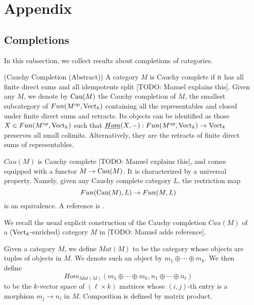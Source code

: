 \appendix
\section{Appendix}
   
\subsection{Completions}

\noindent In this subsection, we collect results about completions of categories.

\begin{definition} \label{definition/cauchy-completion/abstract} (Cauchy Completion (Abstract))
  A category $M$ is Cauchy complete if it has all finite direct sums and all
  idempotents split [TODO: Manuel explains this]. Given any $M$, we denote by $\operatorname{Cau}(M)$ the Cauchy
  completion of $M$, the smallest subcategory of $Fun(M^{op},\operatorname{Vect}_k)$
  containing all the representables and closed under finite direct sums and
  retracts. Its objects can be identified as those $X\in Fun(M^{op},\operatorname{Vect}_k)$
  such that $\underline{Hom}(X,-):Fun(M^{op},\operatorname{Vect}_k)\to\operatorname{Vect}_k$ preserves all
  small colimits. Alternatively, they are the retracts of finite direct sums
  of representables.

  $Cau(M)$ is Cauchy complete [TODO: Manuel explains this], and comes equipped with a functor
  $M\to \operatorname{Cau}(M)$. It is characterized by a universal property. Namely, given
  any Cauchy complete category $L$, the restriction
  map $$Fun(\operatorname{Cau}(M),L)\to Fun(M,L)$$ is an equivalence. A reference is
  \cite[Sections 5.5 and 5.7]{kelly/basic-concepts-enriched}.
\end{definition}

\noindent We recall the usual explicit construction of the Cauchy completion $Cau(M)$ of a ($\operatorname{Vect}_k$-enriched) category $M$ in [TODO: Manuel adds reference].

\begin{definition}

Given a category $M$, we define $Mat(M)$ to be the category whose objects are tuples of objects in $M$. We denote such an object by $m_1\oplus\cdots\oplus m_k$. We then define $$Hom_{Mat(M)}(m_1\oplus\cdots\oplus m_k,n_1\oplus\cdots\oplus n_{\ell})$$ to be the $k$-vector space of $(\ell\times k)$ matrices whose $(i,j)$-th entry is a morphism $m_j\to n_i$ in $M$. Composition is defined by matrix product. \end{definition}

